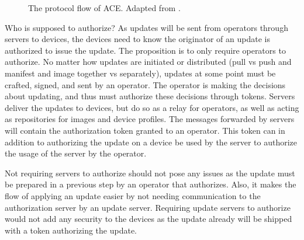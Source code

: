 \documentclass[0-thesis.tex]{subfiles}
\begin{document}
\begin{figure}
    \caption{The protocol flow of ACE. Adapted from \parencite{ace}.}
    \label{fig:ace-flow}
\end{figure}

Who is supposed to authorize? As updates will be sent from operators through servers to
devices, the devices need to know the originator of an update is authorized to issue the
update. The proposition is to only require operators to authorize. No matter how updates
are initiated or distributed (pull vs push and manifest and image together vs separately),
updates at some point must be crafted, signed, and sent by an operator. The operator is
making the decisions about updating, and thus must authorize these decisions through
tokens. Servers deliver the updates to devices, but do so as a relay for operators, as
well as acting as repositories for images and device profiles. The messages forwarded by
servers will contain the authorization token granted to an operator. This token can in
addition to authorizing the update on a device be used by the server to authorize the
usage of the server by the operator. 

Not requiring servers to authorize should not pose any issues as the update must be
prepared in a previous step by an operator that authorizes. Also, it makes the flow of
applying an update easier by not needing communication to the authorization server by an
update server. Requiring update servers to authorize would not add any security to the
devices as the update already will be shipped with a token authorizing the update.
\end{document}
